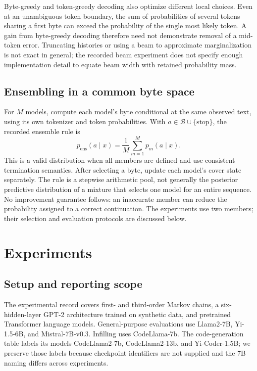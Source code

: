 \documentclass{article}
\newcommand{\bytes}{\mathcal{B}}
\begin{document}
Byte-greedy and token-greedy decoding also optimize different local choices. Even at an unambiguous token boundary, the sum of probabilities of several tokens sharing a first byte can exceed the probability of the single most likely token. A gain from byte-greedy decoding therefore need not demonstrate removal of a mid-token error. Truncating histories or using a beam to approximate marginalization is not exact in general; the recorded beam experiment does not specify enough implementation detail to equate beam width with retained probability mass.

\subsection{Ensembling in a common byte space}
For $M$ models, compute each model's byte conditional at the same observed text, using its own tokenizer and token probabilities. With $a\in\bytes\cup\{\mathrm{stop}\}$, the recorded ensemble rule is
\begin{equation}
 p_{\mathrm{ens}}(a\mid x)=\frac{1}{M}\sum_{m=1}^{M}p_m(a\mid x).
 \label{eq:ensemble}
\end{equation}
This is a valid distribution when all members are defined and use consistent termination semantics. After selecting a byte, update each model's cover state separately. The rule is a stepwise arithmetic pool, not generally the posterior predictive distribution of a mixture that selects one model for an entire sequence. No improvement guarantee follows: an inaccurate member can reduce the probability assigned to a correct continuation. The experiments use two members; their selection and evaluation protocols are discussed below.

\section{Experiments}
\label{sec:experiments}
\subsection{Setup and reporting scope}
The experimental record covers first- and third-order Markov chains, a six-hidden-layer GPT-2 architecture trained on synthetic data, and pretrained Transformer language models. General-purpose evaluations use Llama2-7B, Yi-1.5-6B, and Mistral-7B-v0.3. Infilling uses CodeLlama-7b. The code-generation table labels its models CodeLlama2-7b, CodeLlama2-13b, and Yi-Coder-1.5B; we preserve those labels because checkpoint identifiers are not supplied and the 7B naming differs across experiments.
\end{document}
